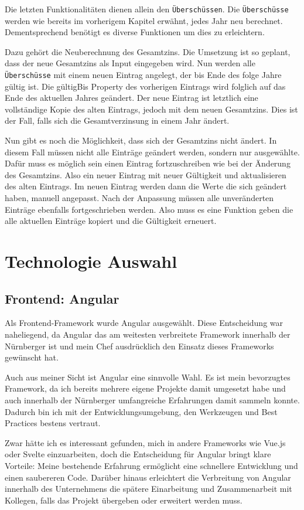 Die letzten Funktionalitäten dienen allein den \texttt{Überschüssen}. Die \texttt{Überschüsse} werden wie bereits im vorherigem Kapitel erwähnt, jedes Jahr neu berechnet.
Dementsprechend benötigt es diverse Funktionen um dies zu erleichtern. 

Dazu gehört die Neuberechnung des Gesamtzins. Die Umsetzung ist so geplant, dass der neue Gesamtzins als Input eingegeben wird.
Nun werden alle \texttt{Überschüsse} mit einem neuen Eintrag angelegt, der bis Ende des folge Jahre gültig ist. Die gültigBis Property des vorherigen Eintrags wird folglich auf das Ende des aktuellen Jahres geändert.
Der neue Eintrag ist letztlich eine vollständige Kopie des alten Eintrags, jedoch mit dem neuen Gesamtzins. Dies ist der Fall, falls sich die Gesamtverzinsung in einem Jahr ändert.

Nun gibt es noch die Möglichkeit, dass sich der Gesamtzins nicht ändert. In diesem Fall müssen nicht alle Einträge geändert werden, sondern nur ausgewählte. 
Dafür muss es möglich sein einen Eintrag fortzuschreiben wie bei der Änderung des Gesamtzins. Also ein neuer Eintrag mit neuer Gültigkeit und aktualisieren des alten Eintrags.
Im neuen Eintrag werden dann die Werte die sich geändert haben, manuell angepasst. Nach der Anpassung müssen alle unveränderten Einträge ebenfalls fortgeschrieben werden. 
Also muss es eine Funktion geben die alle aktuellen Einträge kopiert und die Gültigkeit erneuert.

\section{Technologie Auswahl}
\subsection{Frontend: Angular}
Als Frontend-Framework wurde Angular ausgewählt. Diese Entscheidung war naheliegend, da Angular das am weitesten verbreitete Framework innerhalb der Nürnberger ist und mein Chef ausdrücklich den Einsatz dieses Frameworks gewünscht hat.

Auch aus meiner Sicht ist Angular eine sinnvolle Wahl. Es ist mein bevorzugtes Framework, da ich bereits mehrere eigene Projekte damit umgesetzt habe und auch innerhalb der Nürnberger umfangreiche Erfahrungen damit sammeln konnte. 
Dadurch bin ich mit der Entwicklungsumgebung, den Werkzeugen und Best Practices bestens vertraut.

Zwar hätte ich es interessant gefunden, mich in andere Frameworks wie Vue.js oder Svelte einzuarbeiten, doch die Entscheidung für Angular bringt klare Vorteile: 
Meine bestehende Erfahrung ermöglicht eine schnellere Entwicklung und einen saubereren Code. Darüber hinaus erleichtert die Verbreitung von Angular innerhalb des Unternehmens die spätere Einarbeitung und Zusammenarbeit mit Kollegen, falls das Projekt übergeben oder erweitert werden muss.
